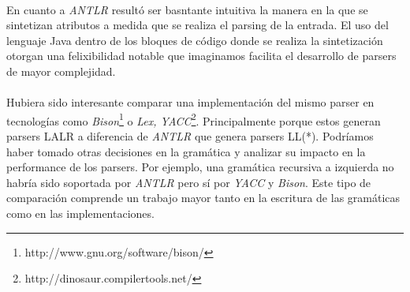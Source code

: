 \paragraph{}En cuanto a \emph{ANTLR} result\'o ser basntante intuitiva la manera en la que se sintetizan atributos a medida que se realiza el parsing de la entrada. El uso del lenguaje Java dentro de los bloques de c\'odigo donde se realiza la sintetizaci\'on otorgan una felixibilidad notable que imaginamos facilita el desarrollo de parsers de mayor complejidad.

\paragraph{}Hubiera sido interesante comparar una implementaci\'on del mismo parser en tecnolog\'ias como \emph{Bison}\footnote{http://www.gnu.org/software/bison/} o \emph{Lex, YACC}\footnote{http://dinosaur.compilertools.net/}. Principalmente porque estos generan parsers LALR a diferencia de \emph{ANTLR} que genera parsers LL(*). Podríamos haber tomado otras decisiones en la gram\'atica y analizar su impacto en la performance de los parsers. Por ejemplo, una gram\'atica recursiva a izquierda no habr\'ia sido soportada por \emph{ANTLR} pero s\'i por \emph{YACC} y \emph{Bison}. Este tipo de comparaci\'on comprende un trabajo mayor tanto en la escritura de las gram\'aticas como en las implementaciones.
